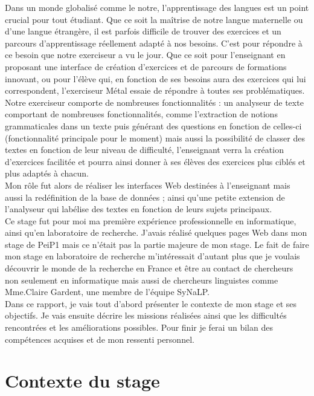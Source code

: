 \documentclass[12pt]{article}
\begin{document}
Dans un monde globalisé comme le notre, l’apprentissage des langues est un point crucial pour tout étudiant. Que ce soit la maîtrise de notre langue maternelle ou d’une langue étrangère, il est parfois difficile de trouver des exercices et un parcours d’apprentissage réellement adapté à nos besoins. C’est pour répondre à ce besoin que notre exerciseur a vu le jour. Que ce soit pour l’enseignant en proposant une interface de création d’exercices et de parcours de formations innovant, ou pour l’élève qui, en fonction de ses besoins aura des exercices qui lui correspondent, l’exerciseur Métal essaie de répondre à toutes ses problématiques.  \\
Notre exerciseur comporte de nombreuses fonctionnalités : un analyseur de texte comportant de nombreuses fonctionnalités, comme l'extraction de notions grammaticales dans un texte puis générant des questions en fonction de celles-ci (fonctionnalité principale pour le moment) mais aussi la possibilité de classer des textes en fonction de leur niveau de difficulté, l'enseignant verra la création d'exercices facilitée et pourra ainsi donner à ses élèves des exercices plus ciblés et plus adaptés à chacun. \\
Mon rôle fut alors de réaliser les interfaces Web destinées à l'enseignant mais aussi la redéfinition de la base de données ; ainsi qu'une petite extension de l'analyseur qui labélise des textes en fonction de leurs sujets principaux. \\
Ce stage fut pour moi ma première expérience professionnelle en informatique, ainsi qu’en laboratoire de recherche. J’avais réalisé quelques pages Web dans mon stage de PeiP1 mais ce n’était pas la partie majeure de mon stage. Le fait de faire mon stage en laboratoire de recherche m'intéressait d’autant plus que je voulais découvrir le monde de la recherche en France et être au contact de chercheurs non seulement en informatique mais aussi de chercheurs linguistes comme Mme.Claire Gardent, une membre de l’équipe SyNaLP. \\
Dans ce rapport, je vais tout d’abord présenter le contexte de mon stage et ses objectifs. Je vais ensuite décrire les missions réalisées ainsi que les difficultés rencontrées et les améliorations possibles. Pour finir je ferai un bilan des compétences acquises et de mon ressenti personnel. 

\newpage 

\section{Contexte du stage}
\end{document}
